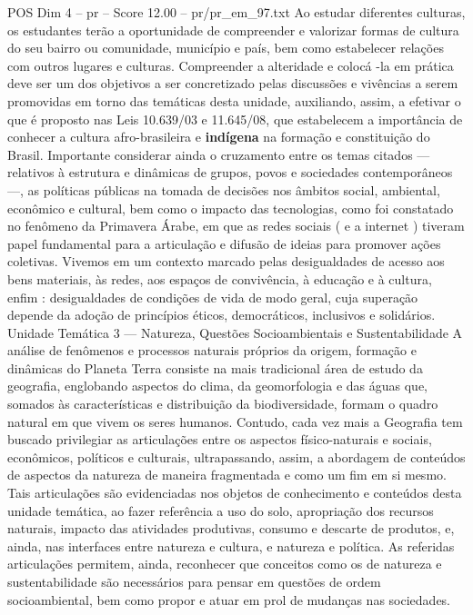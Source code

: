 \begin{textsample}{POS Dim 4 – pr – Score 12.00 – pr/pr\_em\_97.txt}
Ao estudar diferentes culturas, os estudantes terão a oportunidade de compreender e valorizar formas de cultura do seu bairro ou comunidade, município e país, bem como estabelecer relações com outros lugares e culturas.
Compreender a alteridade e colocá -la em prática deve ser um dos objetivos a ser concretizado pelas discussões e vivências a serem promovidas em torno das temáticas desta unidade, auxiliando, assim, a efetivar o que é proposto nas Leis 10.639/03 e 11.645/08, que estabelecem a importância de conhecer a cultura afro-brasileira e \textbf{indígena} na formação e constituição do Brasil.
Importante considerar ainda o cruzamento entre os temas citados — relativos à estrutura e dinâmicas de grupos, povos e sociedades contemporâneos —, as políticas públicas na tomada de decisões nos âmbitos social, ambiental, econômico e cultural, bem como o impacto das tecnologias, como foi constatado no fenômeno da Primavera Árabe, em que as redes sociais ( e a internet ) tiveram papel fundamental para a articulação e difusão de ideias para promover ações coletivas.
Vivemos em um contexto marcado pelas desigualdades de acesso aos bens materiais, às redes, aos espaços de convivência, à educação e à cultura, enfim : desigualdades de condições de vida de modo geral, cuja superação depende da adoção de princípios éticos, democráticos, inclusivos e solidários.
Unidade Temática 3 — Natureza, Questões Socioambientais e Sustentabilidade A análise de fenômenos e processos naturais próprios da origem, formação e dinâmicas do Planeta Terra consiste na mais tradicional área de estudo da geografia, englobando aspectos do clima, da geomorfologia e das águas que, somados às características e distribuição da biodiversidade, formam o quadro natural em que vivem os seres humanos.
Contudo, cada vez mais a Geografia tem buscado privilegiar as articulações entre os aspectos físico-naturais e sociais, econômicos, políticos e culturais, ultrapassando, assim, a abordagem de conteúdos de aspectos da natureza de maneira fragmentada e como um fim em si mesmo.
Tais articulações são evidenciadas nos objetos de conhecimento e conteúdos desta unidade temática, ao fazer referência a uso do solo, apropriação dos recursos naturais, impacto das atividades produtivas, consumo e descarte de produtos, e, ainda, nas interfaces entre natureza e cultura, e natureza e política.
As referidas articulações permitem, ainda, reconhecer que conceitos como os de natureza e sustentabilidade são necessários para pensar em questões de ordem socioambiental, bem como propor e atuar em prol de mudanças nas sociedades.

\end{textsample}
